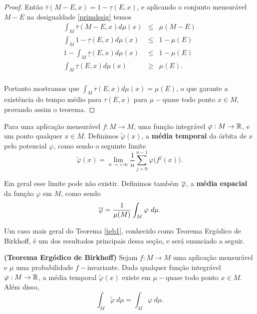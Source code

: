 \begin{proof}
Então $\overline{\tau}(M-E,x)=1-\underline{\tau}(E,x)$, e aplicando o conjunto mensurável $M-E$ na desigualdade \eqref{primdesig} temos
\begin{eqnarray*}
\int_{M}\overline{\tau}(M-E,x)d\mu(x) & \leq & \mu(M-E)\\
\int_{M}1-\underline{\tau}(E,x)d\mu(x) & \leq & 1-\mu(E)\\
1-\int_{M}\underline{\tau}(E,x)d\mu(x) & \leq & 1-\mu(E)\\
\int_{M}\underline{\tau}(E,x)d\mu(x) & \geq & \mu(E).\\
\end{eqnarray*}

Portanto mostramos que $\int_{M}\tau(E,x)d\mu(x)=\mu(E)$, o que garante a existência do tempo médio para $\tau(E,x)$ para $\mu-$quase todo ponto $x\in M$, provando assim o teorema.
\end{proof}

Para uma aplicação mensurável $f:M\to M$, uma função integrável $\varphi:M\to \mathbb{R}$, e um ponto qualquer $x\in M$. Definimos $\tilde{\varphi}(x)$, a \textbf{média temporal} da órbita de $x$ pelo potencial $\varphi$, como sendo o seguinte limite
\begin{equation*}
\tilde{\varphi}(x) = \lim_{n\to+\infty}\dfrac{1}{n}\sum_{j=0}^{n-1}{\varphi\big(f^j(x)\big)}.
\end{equation*}

Em geral esse limite pode não existir. Definimos também $\overline{\varphi}$, a \textbf{média espacial} da função $\varphi$ em $M$, como sendo 
\begin{equation*}
\fecho{\varphi}=\dfrac{1}{\mu(M)}\int_{M}\varphi\ d\mu.
\end{equation*}

Um caso mais geral do Teorema \ref{teb1}, conhecido como Teorema Ergódico de Birkhoff, é um dos resultados principais dessa seção, e será enunciado a seguir.

\begin{teorema}\label{teb} {\bf (Teorema Ergódico de Birkhoff)} Sejam $f : M \to M$ uma aplicação mensurável e $\mu$ uma probabilidade $f-$invariante. Dada qualquer função integrável $\varphi : M \to \mathbb{R}$, a média temporal $\tilde{\varphi}(x)$ existe em $\mu-$quase todo ponto $x\in M$. Além disso,
\begin{equation*}
\int_{M}{\tilde{\varphi}\ d\mu}=\int_{M}{\varphi\ d\mu}.
\end{equation*}
\end{teorema}

